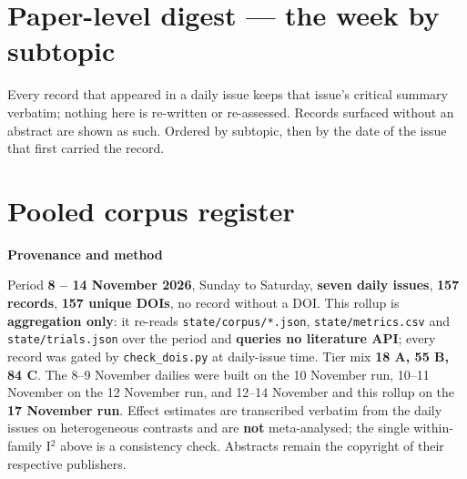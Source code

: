 \documentclass[10pt]{article}
\begin{document}
\clearpage

\section*{\sffamily\bfseries\color{Deep}Paper-level digest --- the week by subtopic}
\vspace{-1.5mm}{\color{Teal}\rule{\linewidth}{1.1pt}}\vspace{1mm}

{\fontsize{7.4}{9}\selectfont\color{Slate}Every record that appeared in a daily issue
keeps that issue's critical summary verbatim; nothing here is re-written or re-assessed.
Records surfaced without an abstract are shown as such. Ordered by subtopic, then by the
date of the issue that first carried the record.\par}



\section*{\sffamily\bfseries\color{Deep}Pooled corpus register}
\vspace{-1.5mm}{\color{Teal}\rule{\linewidth}{1.1pt}}\vspace{2.5mm}



\vspace{4mm}
\begin{keybox}
{\sffamily\bfseries\footnotesize\color{Deep}Provenance and method}\\[1.2mm]
{\fontsize{7.2}{8.8}\selectfont
Period \textbf{8 -- 14 November 2026}, Sunday to Saturday, \textbf{seven daily issues},
\textbf{157 records}, \textbf{157 unique DOIs}, no record without a DOI. This rollup is
\textbf{aggregation only}: it re-reads \texttt{state/corpus/*.json}, \texttt{state/metrics.csv} and
\texttt{state/trials.json} over the period and \textbf{queries no literature API}; every record was gated by
\texttt{check\_dois.py} at daily-issue time. Tier mix \textbf{18 A, 55 B, 84 C}. The 8--9 November dailies were
built on the 10 November run, 10--11 November on the 12 November run, and 12--14 November and this rollup on the
\textbf{17 November run}. Effect estimates are transcribed verbatim from the daily issues on heterogeneous contrasts
and are \textbf{not} meta-analysed; the single within-family I$^2$ above is a consistency check. Abstracts remain
the copyright of their respective publishers.\par}
\end{keybox}
\end{document}
